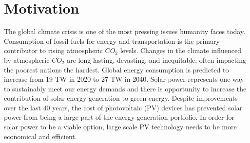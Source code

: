 \section*{Motivation}

The global climate crisis is one of the most pressing issues humanity faces today.
Consumption of fossil fuels for energy and transportation is the primary contributor to rising atmospheric $CO_{2}$ levels\cite{Solomon2009a}.
Changes in the climate influenced by atmospheric $CO_{2}$ are long-lasting, devasting, and inequitable, often impacting the poorest nations the hardest.
Global energy consumption is predicted to increase from 19 TW in 2020 to 27 TW in 2040\cite{Mazzio2015, ieo2020}.
Solar power represents one way to sustainably meet our energy demands and there is opportunity to increase the contribution of solar energy generation to green energy.
Despite improvements over the last 40 years, the cost of photovoltaic (PV) devices has prevented solar power from being a large part of the energy generation portfolio.
In order for solar power to be a viable option, large scale PV technology needs to be more economical and efficient\cite{Mazzio2015,Espinosa2012}.


